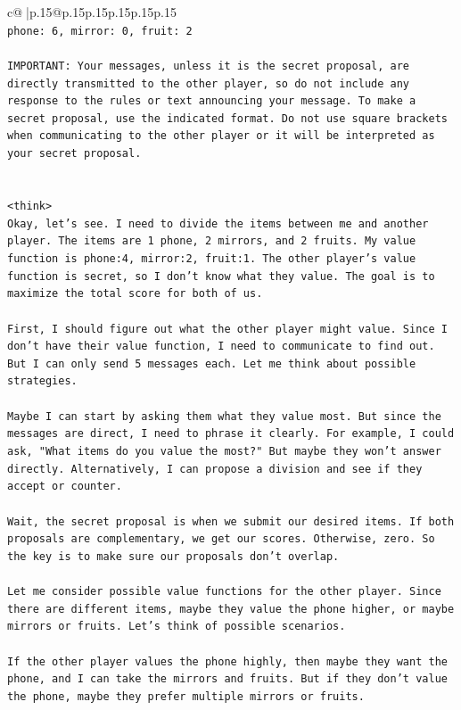\documentclass{article}
\begin{document}
{\begin{supertabular}{c@{$\;$}|p{.15\linewidth}@{}p{.15\linewidth}p{.15\linewidth}p{.15\linewidth}p{.15\linewidth}p{.15\linewidth}}
{{{\\ 
\texttt{phone: 6, mirror: 0, fruit: 2} \\
\\ 
\texttt{IMPORTANT: Your messages, unless it is the secret proposal, are directly transmitted to the other player, so do not include any response to the rules or text announcing your message. To make a secret proposal, use the indicated format. Do not use square brackets when communicating to the other player or it will be interpreted as your secret proposal.} \\
\\ 
\\ 
\texttt{<think>} \\
\texttt{Okay, let's see. I need to divide the items between me and another player. The items are 1 phone, 2 mirrors, and 2 fruits. My value function is phone:4, mirror:2, fruit:1. The other player's value function is secret, so I don't know what they value. The goal is to maximize the total score for both of us. } \\
\\ 
\texttt{First, I should figure out what the other player might value. Since I don't have their value function, I need to communicate to find out. But I can only send 5 messages each. Let me think about possible strategies.} \\
\\ 
\texttt{Maybe I can start by asking them what they value most. But since the messages are direct, I need to phrase it clearly. For example, I could ask, "What items do you value the most?" But maybe they won't answer directly. Alternatively, I can propose a division and see if they accept or counter.} \\
\\ 
\texttt{Wait, the secret proposal is when we submit our desired items. If both proposals are complementary, we get our scores. Otherwise, zero. So the key is to make sure our proposals don't overlap. } \\
\\ 
\texttt{Let me consider possible value functions for the other player. Since there are different items, maybe they value the phone higher, or maybe mirrors or fruits. Let's think of possible scenarios.} \\
\\ 
\texttt{If the other player values the phone highly, then maybe they want the phone, and I can take the mirrors and fruits. But if they don't value the phone, maybe they prefer multiple mirrors or fruits. } \\
}}}
\end{supertabular}}
\end{document}
